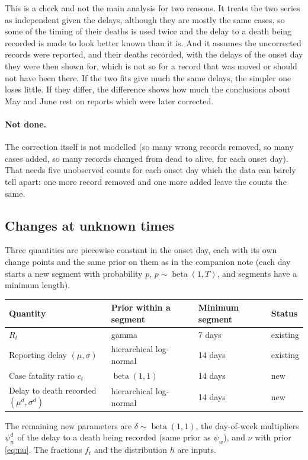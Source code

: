 \documentclass[11pt,a4paper]{article}
\newcommand{\betad}{\operatorname{beta}}
\begin{document}
This is a check and not the main analysis for two reasons. It treats the
two series as independent given the delays, although they are mostly the
same cases, so some of the timing of their deaths is used twice and the
delay to a death being recorded is made to look better known than it is.
And it assumes the uncorrected records were reported, and their deaths
recorded, with the delays of the onset day they were then shown for, which
is not so for a record that was moved or should not have been there. If the
two fits give much the same delays, the simpler one loses little. If they
differ, the difference shows how much the conclusions about May and June
rest on reports which were later corrected.

\paragraph{Not done.} The correction itself is not modelled (so many wrong
records removed, so many cases added, so many records changed from dead to
alive, for each onset day). That needs five unobserved counts for each
onset day which the data can barely tell apart: one more record removed and
one more added leave the counts the same.

\subsection{Changes at unknown times}\label{sec:changes}

Three quantities are piecewise constant in the onset day, each with its own
change points and the same prior on them as in the companion note (each day
starts a new segment with probability $p$, $p\sim\betad(1,T)$, and segments
have a minimum length).
\begin{center}
\begin{tabular}{llll}
\toprule
Quantity & Prior within a segment & Minimum segment & Status \\
\midrule
$R_t$ & gamma & 7 days & existing \\
Reporting delay $(\mu,\sigma)$ & hierarchical log-normal & 14 days & existing \\
Case fatality ratio $c_t$ & $\betad(1,1)$ & 14 days & new \\
Delay to death recorded $(\mu^{d},\sigma^{d})$ & hierarchical log-normal & 14 days & new \\
\bottomrule
\end{tabular}
\end{center}
The remaining new parameters are $\delta\sim\betad(1,1)$, the day-of-week
multipliers $\psi^{d}_w$ of the delay to a death being recorded (same prior
as $\psi_w$), and $\nu$ with prior \eqref{eq:nu}. The fractions $f_t$ and
the distribution $h$ are inputs.
\end{document}
